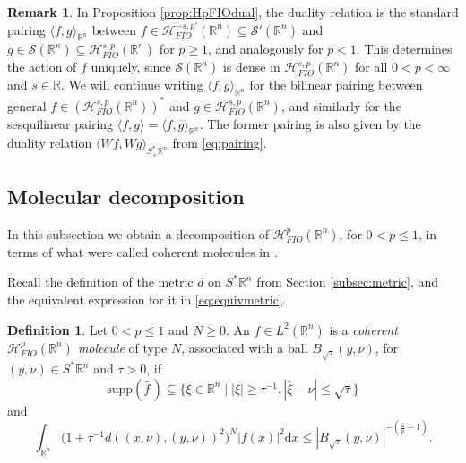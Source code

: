 \documentclass{amsart}
\newcommand {\ud}{\mathrm{d}}
\newcommand {\HT}{\mathcal{H}}
\newcommand {\Hp}{\mathcal{H}^{p}_{FIO}(\Rn)}
\newcommand {\Hps}{\mathcal{H}^{s,p}_{FIO}(\Rn)}
\newcommand {\rb}{\rangle}
\newcommand {\lb}{\langle}
\newcommand {\R}{\mathbb R}
\newcommand {\Rn}{\mathbb{R}^{n}}
\newcommand {\supp}{\mathrm{supp}}
\newcommand {\Sp}{S^{*}\Rn}
\newcommand {\Spp}{S^{*}_{+}\Rn}
\newcommand {\Sw}{\mathcal{S}}
\newcommand {\wh}{\widehat}
\theoremstyle{definition}
\newtheorem{definition}[theorem]{Definition}
\newtheorem{remark}[theorem]{Remark}
\numberwithin{equation}{section}
\begin{document}
\begin{remark}\label{rem:dualrelation}
In Proposition \ref{prop:HpFIOdual}, the duality relation is the standard pairing $\lb f,g\rb_{\Rn}$ between $f\in \HT^{-s,p'}_{FIO}(\Rn)\subseteq\Sw'(\Rn)$ and $g\in\Sw(\Rn)\subseteq\Hps$ for $p\geq1$, and analogously for $p<1$. This determines the action of $f$ uniquely, since $\Sw(\Rn)$ is dense in $\Hps$ for all $0<p<\infty$ and $s\in\R$. We will continue writing $\lb f,g\rb_{\Rn}$ for the bilinear pairing between general $f\in(\Hps)^{*}$ and $g\in\Hps$, and similarly for the sesquilinear pairing $\lb f,g\rb=\lb f,\overline{g}\rb_{\Rn}$. The former pairing is also given by the duality relation $\lb Wf,Wg\rb_{\Spp}$ from \eqref{eq:pairing}. 
%
\end{remark}


\subsection{Molecular decomposition}\label{subsec:moldecomp}

In this subsection we obtain a decomposition of $\Hp$, for $0<p\leq 1$, in terms of what were called coherent molecules in \cite{Smith98a}.

 Recall the definition of the metric $d$ on $\Sp$ from Section \ref{subsec:metric}, and the equivalent expression for it in \eqref{eq:equivmetric}.

\begin{definition}\label{def:molecule}
Let $0<p\leq 1$ and $N\geq0$. %
An $f\in L^{2}(\Rn)$ is a \emph{coherent $\Hp$ molecule} of type $N$, %
associated with a ball $B_{\sqrt{\tau}}(y,\nu)$, for $(y,\nu)\in\Sp$ and $\tau>0$, if 
\[
\supp(\wh{f}\,)\subseteq \{\xi\in \mathbb{R}^{n}\mid |\xi|\geq\tau^{-1},|\hat{\xi}-\nu|\leq \sqrt{\tau}\}
\]
and 
\begin{equation}\label{eq:molecule}
\int_{\Rn} \big(1+\tau^{-1}d((x,\nu),(y,\nu))^{2}\big)^{N}|f(x)|^{2}\ud x\leq |B_{\sqrt{\tau}}(y,\nu)|^{-(\frac{2}{p}-1)}.
\end{equation}
\end{definition}
\end{document}
